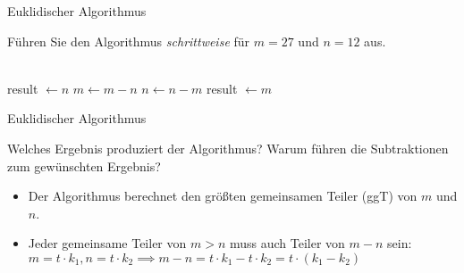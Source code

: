 \begin{frame}{Euklidischer Algorithmus}
    \begin{exercise}[a)]
        Führen Sie den Algorithmus \textit{schrittweise} für $m=27$ und $n=12$ aus.
    \end{exercise}
    \pause[]
    \begin{solve}[a)]
        \begin{minipage}{0.5\textwidth}
        \scriptsize
        \begin{algorithmic}
            \\
                \State result $\gets n$
            \Else
                        \State $m\gets m-n$
                    \Else
                        \State $n\gets n-m$
                    \EndIf
                \EndWhile
                \State result $\gets m$
            \EndIf
        \end{algorithmic}
    \end{minipage}
    \end{solve}
\end{frame}
\addtocounter{exercise}{-1}\addtocounter{solve}{-1}%
\begin{frame}[fragile]{Euklidischer Algorithmus}
    \begin{exercise}[b)]
        Welches Ergebnis produziert der Algorithmus? Warum führen die Subtraktionen zum gewünschten Ergebnis?
    \end{exercise}
    \pause[]
    \begin{solve}[b)]
        \begin{itemize}
            \item Der Algorithmus berechnet den größten gemeinsamen Teiler (ggT) von $m$ und $n$.
            \pause[]\item Jeder gemeinsame Teiler von $m>n$ muss auch Teiler von $m-n$ sein: $m=t\cdot k_1, n=t\cdot k_2\implies m-n=t\cdot k_1-t\cdot k_2=t\cdot\left(k_1-k_2\right)$
        \end{itemize}
    \end{solve}
\end{frame}
